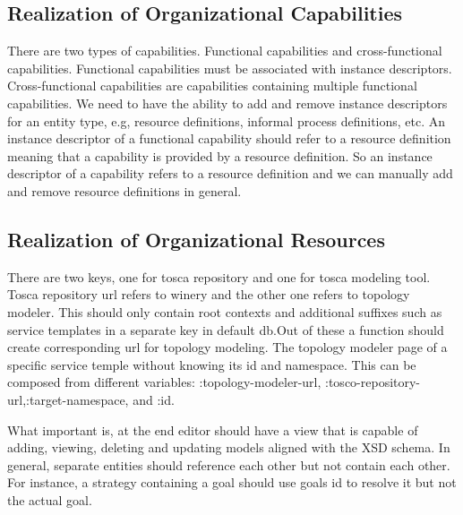 \subsection{Realization of Organizational Capabilities}
There are two types of capabilities. Functional capabilities and cross-functional capabilities. Functional capabilities must be associated with instance descriptors. Cross-functional capabilities are capabilities containing multiple functional capabilities. We need to have the ability to add and remove instance descriptors for an entity type, e.g, resource definitions,  informal process definitions, etc. An instance descriptor of a functional capability should refer to a resource definition meaning that a capability is provided by a resource definition. So an instance descriptor of a capability refers to a resource definition and we can manually add and remove resource definitions in general.




\subsection{Realization of Organizational Resources}
There are two keys, one for tosca repository and one for tosca modeling tool. Tosca repository url refers to winery and the other one refers to topology modeler. This should only contain root contexts and additional suffixes such as service templates in a separate key in default db.Out of these a function should create corresponding url for topology modeling. The topology modeler page of a specific service temple without knowing its id and namespace. This can be composed from different variables: :topology-modeler-url, :tosco-repository-url,:target-namespace, and :id.


	
		
What important is, at the end editor should have a view that is capable of adding, viewing, deleting and updating models aligned with the XSD schema. In general, separate entities should reference each other but not contain each other. For instance, a strategy containing a goal should use goals id to resolve it but not the actual goal.
	
